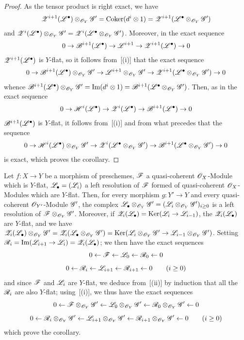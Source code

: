 \begin{proof}
As the tensor product is right exact, we have
\[
  \mathscr{Z}^{i+1}(\mathscr{L}^\bullet)\otimes_{\mathscr{O}_Y}\mathscr{G}' = \operatorname{Coker}(d^i\otimes 1) = \mathscr{Z}^{i+1}(\mathscr{L}^\bullet\otimes_{\mathscr{O}_Y}\mathscr{G}')
\]
and $\mathscr{Z}^{i}(\mathscr{L}^\bullet)\otimes_{\mathscr{O}_Y}\mathscr{G}' = \mathscr{Z}^{i}(\mathscr{L}^\bullet\otimes_{\mathscr{O}_Y}\mathscr{G}')$.
Moreover, in the exact sequence
\[
  0\to\mathscr{B}^{i+1}(\mathscr{L}^\bullet)\to\mathscr{L}^{i+1}\to\mathscr{Z}^{i+1}(\mathscr{L}^\bullet)\to 0
\]
$\mathscr{Z}^{i+1}(\mathscr{L}^\bullet)$ is $Y$-flat, so it follows from~[(i)] that the exact sequence
\[
  0\to\mathscr{B}^{i+1}(\mathscr{L}^\bullet)\otimes_{\mathscr{O}_Y}\mathscr{G}'\to\mathscr{L}^{i+1}\otimes_{\mathscr{O}_Y}\mathscr{G}'\to\mathscr{Z}^{i+1}(\mathscr{L}^\bullet\otimes_{\mathscr{O}_Y}\mathscr{G}')\to 0
\]
whence $\mathscr{B}^{i+1}(\mathscr{L}^\bullet)\otimes_{\mathscr{O}_Y}\mathscr{G}'=\operatorname{Im}(d^i\otimes 1)=\mathscr{B}^{i+1}(\mathscr{L}^\bullet\otimes_{\mathscr{O}_Y}\mathscr{G}')$.
Then, as in the exact sequence
\[
  0\to\mathscr{H}^i(\mathscr{L}^\bullet)\to\mathscr{Z}^i(\mathscr{L}^\bullet)\to\mathscr{B}^{i+1}(\mathscr{L}^\bullet)\to 0
\]
$\mathscr{B}^{i+1}(\mathscr{L}^\bullet)$ is $Y$-flat, it follows from~[(i)] and from what precedes that the sequence
\[
  0\to\mathscr{H}^i(\mathscr{L}^\bullet)\otimes_{\mathscr{O}_Y}\mathscr{G}'\to\mathscr{Z}^i(\mathscr{L}^\bullet\otimes_{\mathscr{O}_Y}\mathscr{G}')\to\mathscr{B}^{i+1}(\mathscr{L}^\bullet\otimes_{\mathscr{O}_Y}\mathscr{G}')\to 0
\]
is exact, which proves the corollary.
\end{proof}

\begin{corollary}[2.1.10]
\label{IV.2.1.10}
Let $f:X\to Y$ be a morphism of preschemes, $\mathscr{F}$ a quasi-coherent $\mathscr{O}_X$-Module which is $Y$-flat, $\mathscr{L}_\bullet=(\mathscr{L}_i)$ a left resolution of $\mathscr{F}$ formed of quasi-coherent $\mathscr{O}_X$-Modules which are $Y$-flat.
Then, for every morphism $g:Y'\to Y$ and every quasi-coherent $\mathscr{O}_{Y'}$-Module $\mathscr{G}'$, the complex $\mathscr{L}_\bullet\otimes_{\mathscr{O}_Y}\mathscr{G}'=(\mathscr{L}_i\otimes_{\mathscr{O}_Y}\mathscr{G}')_{i\geq 0}$ is a left resolution of $\mathscr{F}\otimes_{\mathscr{O}_Y}\mathscr{G}'$.
Moreover, if $\mathscr{Z}_i(\mathscr{L}_\bullet)=\operatorname{Ker}(\mathscr{L}_i\to\mathscr{L}_{i-1})$, the $\mathscr{Z}_i(\mathscr{L}_\bullet)$ are $Y$-flat, and we have $\mathscr{Z}_i(\mathscr{L}_\bullet)\otimes_{\mathscr{O}_Y}\mathscr{G}'=\mathscr{Z}_i(\mathscr{L}_\bullet\otimes_{\mathscr{O}_Y}\mathscr{G}')=\operatorname{Ker}(\mathscr{L}_i\otimes_{\mathscr{O}_Y}\mathscr{G}'\to\mathscr{L}_{i-1}\otimes_{\mathscr{O}_Y}\mathscr{G}')$.
Setting $\mathscr{R}_i=\operatorname{Im}(\mathscr{L}_{i+1}\to\mathscr{L}_i)=\mathscr{Z}_i(\mathscr{L}_\bullet)$; we then have the exact sequences
\[
  0\leftarrow\mathscr{F}\leftarrow\mathscr{L}_0\leftarrow\mathscr{R}_0\leftarrow 0
\]
\[
  0\leftarrow\mathscr{R}_i\leftarrow\mathscr{L}_{i+1}\leftarrow\mathscr{R}_{i+1}\leftarrow 0 \qquad (i\geq 0)
\]
and since $\mathscr{F}$ and $\mathscr{L}_i$ are $Y$-flat, we deduce from~[(ii)] by induction that all the $\mathscr{R}_i$ are also $Y$-flat; using~[(i)], we thus have the exact sequences
\[
  0\leftarrow\mathscr{F}\otimes_{\mathscr{O}_Y}\mathscr{G}'\leftarrow\mathscr{L}_0\otimes_{\mathscr{O}_Y}\mathscr{G}'\leftarrow\mathscr{R}_0\otimes_{\mathscr{O}_Y}\mathscr{G}'\leftarrow 0
\]
\[
  0\leftarrow\mathscr{R}_i\otimes_{\mathscr{O}_Y}\mathscr{G}'\leftarrow\mathscr{L}_{i+1}\otimes_{\mathscr{O}_Y}\mathscr{G}'\leftarrow\mathscr{R}_{i+1}\otimes_{\mathscr{O}_Y}\mathscr{G}'\leftarrow 0 \qquad (i\geq 0)
\]
which prove the corollary.
\end{corollary}

